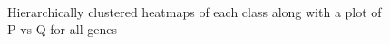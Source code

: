 \documentclass[prl,amsmath,amssymb,floatfix,superscriptaddress,notitlepage,twocolumn]{revtex4}
\begin{document}
{\begin{figure}[!ht]
  \centering
  \quad
  \\
  \quad
  \caption{Hierarchically clustered heatmaps of each class along with a plot of P vs Q for all genes}
  \label{fig:1}
\end{figure}

}
\end{document}
